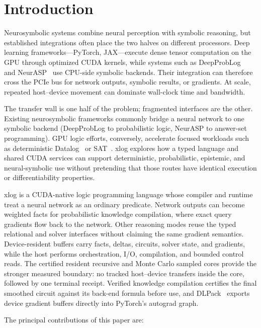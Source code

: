 \section{Introduction}\label{sec:intro}

Neurosymbolic systems combine neural perception with symbolic reasoning, but established integrations often place the two halves on different processors. Deep learning frameworks---PyTorch, JAX---execute dense tensor computation on the GPU through optimized CUDA kernels, while systems such as DeepProbLog~\cite{deepproblog} and NeurASP~\cite{neurasp} use CPU-side symbolic backends. Their integration can therefore cross the PCIe bus for network outputs, symbolic results, or gradients. At scale, repeated host--device movement can dominate wall-clock time and bandwidth.

The transfer wall is one half of the problem; fragmented interfaces are the other. Existing neurosymbolic frameworks commonly bridge a neural network to one symbolic backend (DeepProbLog to probabilistic logic, NeurASP to answer-set programming). GPU logic efforts, conversely, accelerate focused workloads such as deterministic Datalog~\cite{gpulog,vflog} or SAT~\cite{parafrost}. xlog explores how a typed language and shared CUDA services can support deterministic, probabilistic, epistemic, and neural-symbolic use without pretending that those routes have identical execution or differentiability properties.

xlog is a CUDA-native logic programming language whose compiler and runtime treat a neural network as an ordinary predicate. Network outputs can become weighted facts for probabilistic knowledge compilation, where exact query gradients flow back to the network. Other reasoning modes reuse the typed relational and solver interfaces without claiming the same gradient semantics. Device-resident buffers carry facts, deltas, circuits, solver state, and gradients, while the host performs orchestration, I/O, compilation, and bounded control reads. The certified resident recursive and Monte Carlo sampled cores provide the stronger measured boundary: no tracked host--device transfers inside the core, followed by one terminal receipt. Verified knowledge compilation certifies the final smoothed circuit against its back-end formula before use, and DLPack~\cite{dlpack} exports device gradient buffers directly into PyTorch's autograd graph.

The principal contributions of this paper are:

